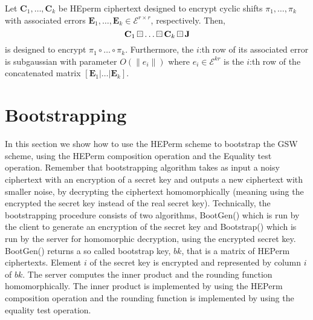 \begin{corollary}\label{cor:HEPerm_product}
    Let $\mathbf{C}_1, \dots, \mathbf{C}_k$ be HEperm ciphertext designed to encrypt cyclic shifts $\pi_1, \dots, \pi_k$ with associated errors $\mathbf{E}_1, \dots, \mathbf{E}_k \in \mathcal{E}^{r \times r}$, respectively. Then,
    \begin{equation}
        \mathbf{C}_1 \boxring \dots \boxring \mathbf{C}_k \boxring \mathbf{J}
    \end{equation}
    is designed to encrypt $\pi_1 \circ \dots \circ \pi_k$. Furthermore, the $i$:th row of its associated error is subgaussian with parameter $O(\|e_i\|)$ where $e_i \in \mathcal{E}^{kr}$ is the $i$:th row of the concatenated matrix $[\mathbf{E}_1 | \dots | \mathbf{E}_k]$.
\end{corollary}

\section{Bootstrapping}
In this section we show how to use the HEPerm scheme to bootstrap the GSW scheme, using the HEPerm composition operation and the Equality test operation. Remember that bootstrapping algorithm takes as input a noisy ciphertext with an encryption of a secret key and outputs a new ciphertext with smaller noise, by decrypting the ciphertext homomorphically (meaning using the encrypted the secret key instead of the real secret key). Technically, the bootstrapping procedure consists of two algorithms, BootGen() which is run by the client to generate an encryption of the secret key and Bootstrap() which is run by the server for homomorphic decryption, using the encrypted secret key. BootGen() returns a so called bootstrap key, $bk$, that is a matrix of HEPerm ciphertexts. Element $i$ of the secret key is encrypted and represented by column $i$ of $bk$. The server computes the inner product and the rounding function homomorphically. The inner product is implemented by using the HEPerm composition operation and the rounding function is implemented by using the equality test operation.


